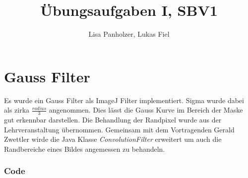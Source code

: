 \documentclass[12pt,german]{article}
\begin{document}
\title{Übungsaufgaben I, SBV1 }
\author{Lisa Panholzer, Lukas Fiel}
\maketitle


\newpage
\section{Gauss Filter}
Es wurde ein Gauss Filter als ImageJ Filter implementiert. Sigma wurde dabei als zirka $ \frac{radius}{3} $ angenommen. Dies lässt die Gauss Kurve im Bereich der Maske gut erkennbar darstellen. Die Behandlung der Randpixel wurde aus der Lehrveranstaltung übernommen. Gemeinsam mit dem Vortragenden Gerald Zwettler wirde die Java Klasse \textit{ConvolutionFilter} erweitert um auch die Randbereiche eines Bildes angemessen zu behandeln.

\subsubsection{Code}

\end{document}
